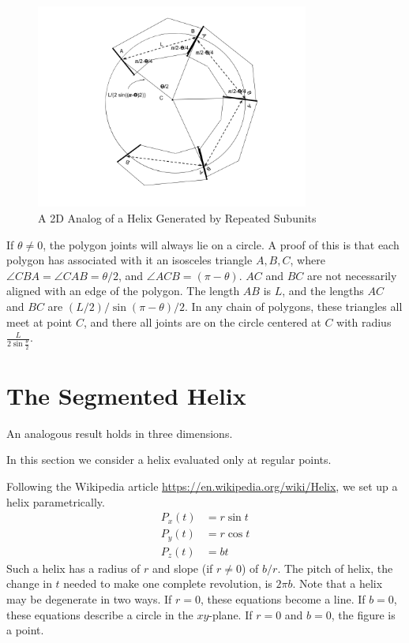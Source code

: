 \documentclass[11pt]{article}
\begin{document}
{\begin{figure}
     \centering
     \includegraphics[width=0.80\textwidth]{figures/2DPolygonStacking.png}
     \caption{A 2D Analog of a Helix Generated by Repeated Subunits}
  \label{fig:prismdiagram}
\end{figure}

If $\theta \neq 0$, the polygon joints will always lie on a circle. A proof of this
is that each polygon has associated with it an isosceles triangle $A,B,C$, where $\angle CBA = \angle CAB = \theta/2$,
and $\angle ACB = (\pi - \theta)$. $AC$ and $BC$ are not necessarily aligned with an edge of the polygon.
The length $AB$ is $L$, and the lengths $AC$ and $BC$ are
$(L/2) / \sin{(\pi - \theta)/2}$. In any chain of polygons, these triangles all meet at point $C$, and there all
joints are on the circle centered at $C$ with radius $\frac{L}{2 \sin{\frac{\theta}{2}}}$.


\label{sec:2d}

\section{The Segmented Helix}

An analogous result holds in three dimensions.

In this section we consider a helix evaluated only at regular points.

Following the Wikipedia article \url{https://en.wikipedia.org/wiki/Helix}, we set up a helix parametrically.
\begin{align*}
    P_x(t) &= r \sin{t}  \\
    P_y(t) &= r \cos{t} \\
   P_z(t) &= b t
\end{align*}
Such a helix has a radius of $r$ and slope (if $r \neq 0$) of $b/r$.
The pitch of helix, the change in $t$ needed to make one complete revolution, is $2\pi b$.
Note that a helix may be degenerate in two ways.
If $r = 0$, these equations become a line. If $b = 0$, these equations describe a circle in the $xy$-plane.
If $r = 0$ and $b = 0$, the figure is a point.

}
\end{document}
